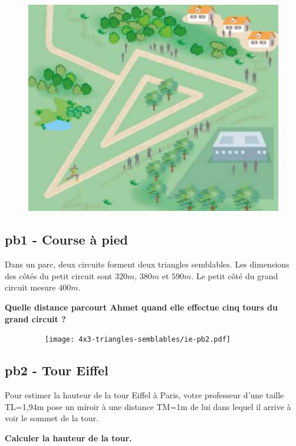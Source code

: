 \begin{minipage}[t]{0.3\textwidth}
  \begin{figure}[H]
        \includegraphics[width=0.7\linewidth]{4x3-triangles-semblables/ie-pb1.png}
  \end{figure}
\end{minipage}
\begin{minipage}[t]{0.65\textwidth}
  \subsection*{pb1 - Course à pied}

  Dans un parc, deux circuits forment deux triangles semblables. Les dimensions des côtés du petit circuit sont $320m$, $380m$ et $590m$. Le petit côté du grand circuit mesure $400 m$.

  \textbf{Quelle distance parcourt Ahmet quand elle effectue cinq tours du grand circuit ?}
\end{minipage}

\horrule{1px}

\begin{minipage}[t]{0.5\textwidth}
  \begin{figure}[H]
          \texttt{[image: 4x3-triangles-semblables/ie-pb2.pdf]}
  \end{figure}
\end{minipage}
\begin{minipage}[t]{0.45\textwidth}
  \subsection*{pb2 - Tour Eiffel}

  Pour estimer la hauteur de la tour Eiffel à Paris, votre professeur d'une taille TL=1,94m pose un miroir à une distance TM=1m de lui dans lequel il arrive à voir le sommet de la tour. 

\textbf{Calculer la hauteur de la tour.}
\end{minipage}

